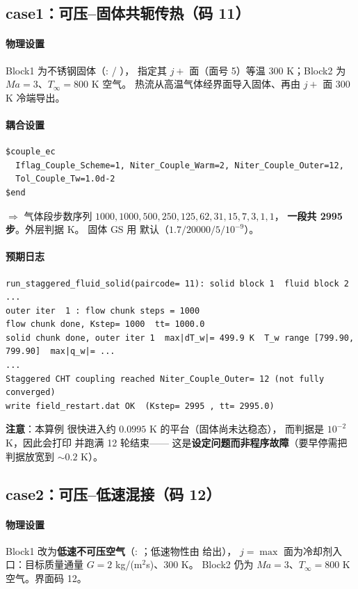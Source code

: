 \subsection{case1：可压--固体共轭传热（码 11）}
\paragraph{物理设置}
Block1 为不锈钢固体（:  / ），
 指定其 $j+$ 面（面号 5）等温 300 K；Block2 为 $Ma=3$、$T_\infty=800$ K 空气。
热流从高温气体经界面导入固体、再由 $j+$ 面 300 K 冷端导出。

\paragraph{耦合设置}
\begin{lstlisting}
$couple_ec
  Iflag_Couple_Scheme=1, Niter_Couple_Warm=2, Niter_Couple_Outer=12,
  Tol_Couple_Tw=1.0d-2
$end
\end{lstlisting}
$\Rightarrow$ 气体段步数序列 $1000,1000,500,250,125,62,31,15,7,3,1,1$，
\textbf{一段共 2995 步}。外层判据  K。
固体 GS 用  默认（$1.7/20000/5/10^{-9}$）。

\paragraph{预期日志}
\begin{lstlisting}
run_staggered_fluid_solid(paircode= 11): solid block 1  fluid block 2 ...
outer iter  1 : flow chunk steps = 1000
flow chunk done, Kstep= 1000  tt= 1000.0
solid chunk done, outer iter 1  max|dT_w|= 499.9 K  T_w range [799.90, 799.90]  max|q_w|= ...
...
Staggered CHT coupling reached Niter_Couple_Outer= 12 (not fully converged)
write field_restart.dat OK  (Kstep= 2995 , tt= 2995.0)
\end{lstlisting}
\textbf{注意}：本算例  很快进入约 $0.0995$ K 的平台（固体尚未达稳态），
而判据是 $10^{-2}$ K，因此会打印  并跑满 12 轮结束——
这是\textbf{设定问题而非程序故障}（要早停需把判据放宽到 $\sim0.2$ K）。

\subsection{case2：可压--低速混接（码 12）}
\paragraph{物理设置}
Block1 改为\textbf{低速不可压空气}（: ；低速物性由  给出），
$j=\max$ 面为冷却剂入口：目标质量通量 $G=2$ kg/(m$^2$s)、300 K。
Block2 仍为 $Ma=3$、$T_\infty=800$ K 空气。界面码 12。

